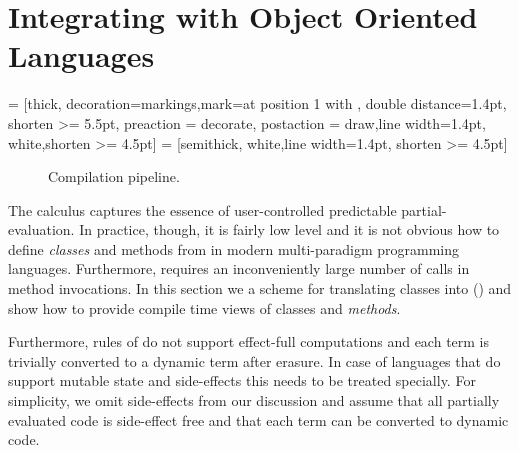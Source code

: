 \section{Integrating \calculus with Object Oriented Languages}
\label{sct:scala-translation}
\usetikzlibrary{arrows, decorations.markings}
 = [thick, decoration={markings,mark=at position
   1 with {}},
   double distance=1.4pt, shorten >= 5.5pt,
   preaction = {decorate},
   postaction = {draw,line width=1.4pt, white,shorten >= 4.5pt}]
 = [semithick, white,line width=1.4pt, shorten >= 4.5pt]

\begin{figure}
\center
{}
\caption{Compilation pipeline.}
\label{fig:phases}
\end{figure}


The \calculus calculus  captures the essence of user-controlled
 predictable partial-evaluation. In practice, though, it is fairly low level and
 it is not obvious how to define \emph{classes} and methods from in modern multi-paradigm
 programming languages. Furthermore, \calculus requires an inconveniently
 large number of  calls in method invocations.
 In this section we a scheme for translating classes into \calculus () and
 show how to provide compile time views of classes and \emph{methods}.


Furthermore, rules of \calculus do not support effect-full computations and each
  term is trivially converted to a dynamic term after erasure.
 In case of languages that do support mutable state and side-effects this needs to
 be treated specially. For simplicity, we omit side-effects from our discussion and
 assume that all partially evaluated code is side-effect free and that each
  term can be converted to dynamic code.

